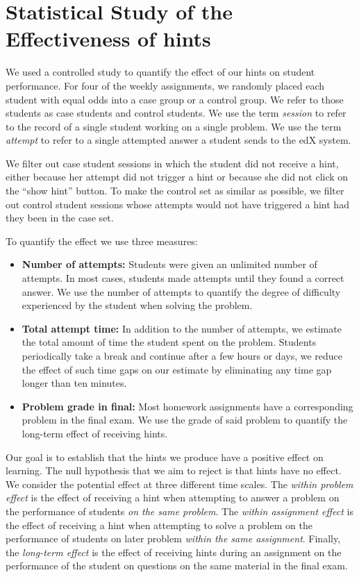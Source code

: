\documentclass{llncs2e/llncs}
\begin{document}
\section{Statistical Study of the Effectiveness of hints}

We used a controlled study to quantify the effect of our hints on
student performance. For four of the weekly assignments, we randomly
placed each student with equal odds into a case group or a control
group. We refer to those students as case students and control
students.  We use the term {\em session} to refer to the record of a
single student working on a single problem. We use the term {\em
  attempt} to refer to a single attempted answer a student sends to
the edX system.

We filter out case student sessions in which the student did not
receive a hint, either because her attempt did not trigger a hint or
because she did not click on the ``show hint'' button.  To make the
control set as similar as possible, we filter out control student
sessions whose attempts would not have triggered a hint had they been
in the case set.

To quantify the effect we use three measures:
\begin{itemize}
\item {\bf Number of attempts:} Students were given an unlimited number of attempts. In most cases, students made attempts until they found a correct answer. We use the number of attempts to quantify the degree of difficulty experienced by the student when solving the problem.

\item {\bf Total attempt time:} In addition to the number of attempts, we estimate the total amount of time the student spent on the problem. Students periodically take a break and continue after a few hours or days, we reduce the effect of such time gaps on our estimate by eliminating any time gap longer than ten minutes.
\item {\bf Problem grade in final:} Most homework assignments have a corresponding problem in the final exam. We use the grade of said problem to quantify the long-term effect of receiving hints. 
\end{itemize}

Our goal is to establish that the hints we produce have a positive effect on learning. The null hypothesis that we aim to reject is that hints have no effect. We consider the potential effect at three different time scales. The {\em within problem effect} is the effect of receiving a hint when attempting to answer a problem on the performance of students {\em on the same problem}. The {\em within assignment effect} is the effect of receiving a hint when attempting to solve a problem on the performance of students on later problem {\em within the same assignment}. Finally, the {\em long-term effect} is the effect of receiving hints during an assignment on the performance of the student on questions on the same material in the final exam.
\end{document}
